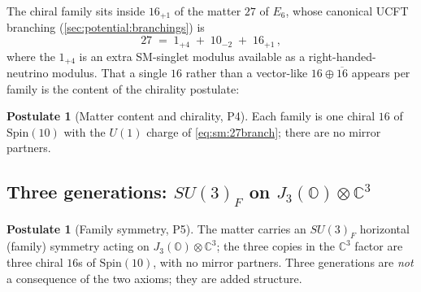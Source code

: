 \documentclass[11pt]{article}
\theoremstyle{plain}
\theoremstyle{definition}
\newtheorem{postulate}[theorem]{Postulate}
\theoremstyle{remark}
\begin{document}
The chiral family sits inside $16_{+1}$ of the matter $27$ of $E_6$, whose canonical
UCFT branching (\autoref{sec:potential:branchings}) is
\begin{equation}\label{eq:sm:27branch}
27 \;=\; 1_{+4}\;+\;10_{-2}\;+\;16_{+1}\,,
\end{equation}
where the $1_{+4}$ is an extra SM-singlet modulus available as a right-handed-neutrino
modulus. That a single $16$ rather than a vector-like $16\oplus\overline{16}$ appears
per family is the content of the chirality postulate:

\begin{postulate}[Matter content and chirality, P4]\label{post:sm:P4}
Each family is one chiral $16$ of $\mathrm{Spin}(10)$ with the $U(1)$ charge of
\eqref{eq:sm:27branch}; there are no mirror partners.
\end{postulate}

\subsection{Three generations: \texorpdfstring{$SU(3)_F$}{SU(3)F} on
\texorpdfstring{$J_3(\mathbb{O})\otimes\mathbb{C}^3$}{J3(O)xC3}}
\label{sec:sm:generations}

\begin{postulate}[Family symmetry, P5]\label{post:sm:P5}
The matter carries an $SU(3)_F$ horizontal (family) symmetry acting on
$J_3(\mathbb{O})\otimes\mathbb{C}^3$; the three copies in the $\mathbb{C}^3$ factor are
three chiral $16$s of $\mathrm{Spin}(10)$, with no mirror partners. Three generations
are \emph{not} a consequence of the two axioms; they are added structure.
\end{postulate}
\end{document}
